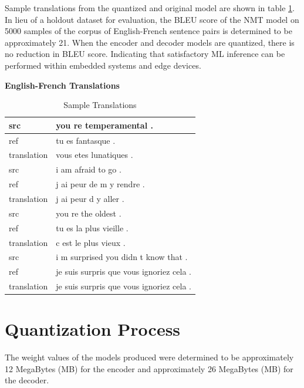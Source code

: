 \documentclass{sigchi}
\begin{document}
\par Sample translations from the quantized and original model are shown in table \ref{tab:sample_trans}. In lieu of a holdout dataset for evaluation, the BLEU score of the NMT model on 5000 samples of the corpus of English-French sentence pairs is determined to be approximately 21. When the encoder and decoder models are quantized, there is no reduction in BLEU score. Indicating that satisfactory ML inference can be performed within embedded systems and edge devices.

\begin{table}[t]
\centering
        \textbf{English-French Translations}
    \begin{tabular}{ p{2cm} | p{4cm} }
     \hline
     src & you re temperamental .\\
     \hline
     ref & tu es fantasque .\\
     \hline
     translation & vous etes lunatiques .\\
     \hline
     \hline 
     src & i am afraid to go .\\
     \hline
     ref & j ai peur de m y rendre .\\
     \hline
     translation & j ai peur d y aller .\\
     \hline
     \hline 
     src & you re the oldest .\\
     \hline
     ref & tu es la plus vieille .\\
     \hline
     translation & c est le plus vieux .\\
     \hline
     \hline 
     src & i m surprised you didn t know that .\\
     \hline
     ref & je suis surpris que vous ignoriez cela .\\
     \hline
     translation & je suis surpris que vous ignoriez cela .\\
    \end{tabular}
\caption{Sample Translations}
\label{tab:sample_trans}

\end{table}

\section{Quantization Process}
\par The weight values of the models produced were determined to be approximately 12 MegaBytes (MB) for the encoder and approximately 26 MegaBytes (MB) for the decoder.
\end{document}
